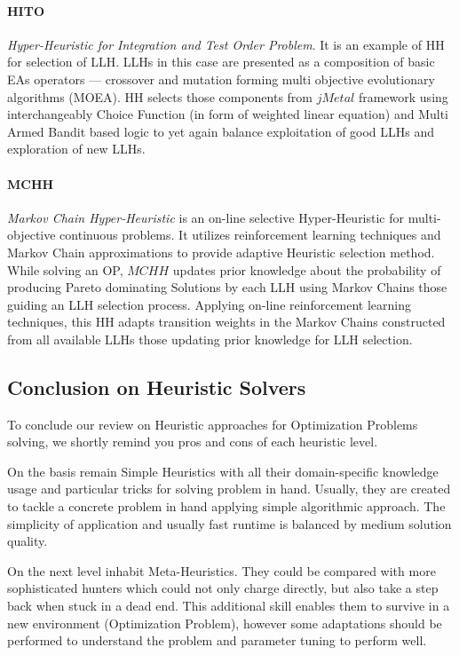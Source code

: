 \paragraph{HITO~\cite{guizzo2015hyper}}\textit{Hyper-Heuristic for Integration and Test Order Problem}. It is an example of HH for selection of LLH. LLHs in this case are presented as a composition of basic EAs operators — crossover and mutation forming multi objective evolutionary algorithms (MOEA). HH  selects those components from $jMetal$ framework\cite{durillo2011jmetal} using interchangeably Choice Function (in form of weighted linear equation) and Multi Armed Bandit based logic to yet again balance exploitation of good LLHs and exploration of new LLHs.


\paragraph{MCHH~\cite{mcclymont2011markov}}\textit{Markov Chain Hyper-Heuristic} is an on-line selective Hyper-Heuristic for multi-objective continuous problems. It utilizes reinforcement learning techniques and Markov Chain approximations to provide adaptive Heuristic selection method. While solving an OP, $MCHH$ updates prior knowledge about the probability of producing Pareto dominating Solutions by each LLH using Markov Chains those guiding an LLH selection process. Applying on-line reinforcement learning techniques, this HH adapts transition weights in the Markov Chains constructed from all available LLHs those updating prior knowledge for LLH selection.


\subsection{Conclusion on Heuristic Solvers}
To conclude our review on Heuristic approaches for Optimization Problems solving, we shortly remind you pros and cons of each heuristic level.

On the basis remain Simple Heuristics with all their domain-specific knowledge usage and particular tricks for solving problem in hand. Usually, they are created to tackle a concrete problem in hand applying simple algorithmic approach. The simplicity of application and usually fast runtime is balanced by medium solution quality.

On the next level inhabit Meta-Heuristics. They could be compared with more sophisticated hunters which could not only charge directly, but also take a step back when stuck in a dead end. This additional skill enables them to survive in a new environment (Optimization Problem), however some adaptations should be performed to understand the problem and parameter tuning to perform well.


